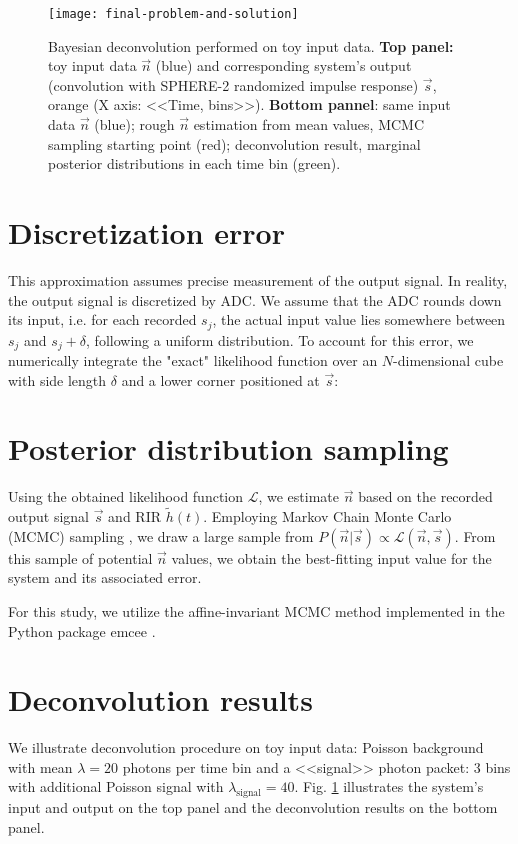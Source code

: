 \begin{figure}
	\centering
	\texttt{[image: final-problem-and-solution]}
	\caption{Bayesian deconvolution performed on toy input data. \textbf{Top panel:} toy input data $\vec{n}$ (blue) and corresponding system's output (convolution with SPHERE-2 randomized impulse response) $\vec{s}$, orange (X axis: <<Time, bins>>). \textbf{Bottom pannel}: same input data $\vec{n}$ (blue); rough $\vec{n}$ estimation from mean values, MCMC sampling starting point (red); deconvolution result, marginal posterior distributions in each time bin (green).}
	\label{pic:bayesian-deconvolution-with-experimantal-rir-and-rounding}
\end{figure}


\section{Discretization error}

This approximation assumes precise measurement of the output signal. In reality, the output signal is discretized by ADC. We assume that the ADC rounds down its input, i.e. for each recorded $s_j$, the actual input value lies somewhere between $s_j$ and $s_j + \delta$, following a uniform distribution. To account for this error, we numerically integrate the "exact" likelihood function over an $N$-dimensional cube with side length $\delta$ and a lower corner positioned at $\vec{s}$:


\section{Posterior distribution sampling}
\label{sec:mcmc-sampling}

Using the obtained likelihood function $\mathcal{L}$, we estimate $\vec{n}$ based on the recorded output signal $\vec{s}$ and RIR $\tilde{h}(t)$. Employing Markov Chain Monte Carlo (MCMC) sampling \cite{Sharma2017}, we draw a large sample from $P(\vec{n} | \vec{s}) \propto \mathcal{L}(\vec{n}, \vec{s})$. From this sample of potential $\vec{n}$ values, we obtain the best-fitting input value for the system and its associated error.

For this study, we utilize the affine-invariant MCMC method \cite{Goodman2010} implemented in the Python package emcee \cite{ForemanMackey2016}.

\section{Deconvolution results}

We illustrate deconvolution procedure on toy input data: Poisson background with mean $\lambda=20$ photons per time bin and a <<signal>> photon packet: 3 bins with additional Poisson signal with $\lambda_{\mathrm{signal}}=40$. Fig. \ref{pic:bayesian-deconvolution-with-experimantal-rir-and-rounding} illustrates the system's input and output on the top panel and the deconvolution results on the bottom panel.
